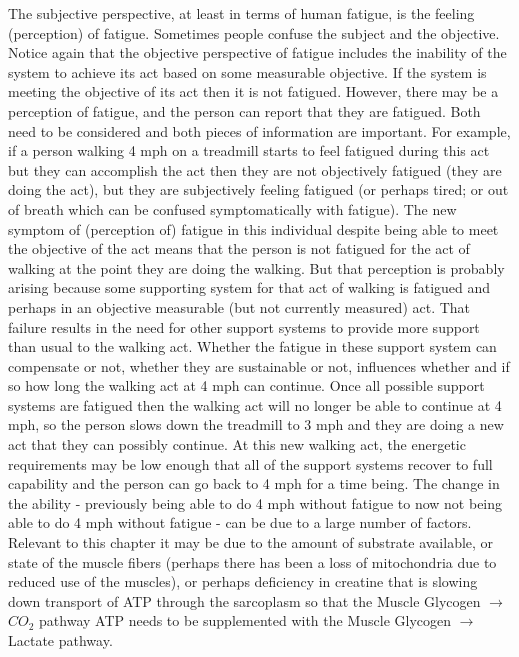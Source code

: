 The subjective perspective, at least in terms of human fatigue, is the feeling (perception) of fatigue. Sometimes people confuse the subject and the objective. Notice again that the objective perspective of fatigue includes the inability of the system to achieve its act based on some measurable objective. If the system is meeting the objective of its act then it is not fatigued. However, there may be a perception of fatigue, and the person can report that they are fatigued. Both need to be considered and both pieces of information are important. For example, if a person walking 4 mph on a treadmill starts to feel fatigued during this act but they can accomplish the act then they are not objectively fatigued (they are doing the act), but they are subjectively feeling fatigued (or perhaps tired; or out of breath which can be confused symptomatically with fatigue). The new symptom of (perception of) fatigue in this individual despite being able to meet the objective of the act means that the person is not fatigued for the act of walking at the point they are doing the walking. But that perception is probably arising because some supporting system for that act of walking is fatigued and perhaps in an objective measurable (but not currently measured) act. That failure results in the need for other support systems to provide more support than usual to the walking act. Whether the fatigue in these support system can compensate or not, whether they are sustainable or not, influences whether and if so how long the walking act at 4 mph can continue. Once all possible support systems are fatigued then the walking act will no longer be able to continue at 4 mph, so the person slows down the treadmill to 3 mph and they are doing a new act that they can possibly continue. At this new walking act, the energetic requirements may be low enough that all of the support systems recover to full capability and the person can go back to 4 mph for a time being. The change in the ability - previously being able to do 4 mph without fatigue to now not being able to do 4 mph without fatigue - can be due to a large number of factors. Relevant to this chapter it may be due to the amount of substrate available, or state of the muscle fibers (perhaps there has been a loss of mitochondria due to reduced use of the muscles), or perhaps deficiency in creatine that is slowing down transport of ATP through the sarcoplasm so that the Muscle Glycogen $\rightarrow$ $CO_2$ pathway ATP needs to be supplemented with the Muscle Glycogen $\rightarrow$ Lactate pathway.


